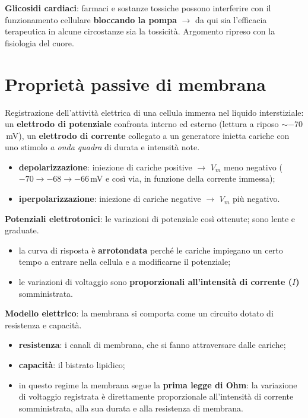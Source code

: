 \textbf{Glicosidi cardiaci}: farmaci e sostanze tossiche possono interferire con il funzionamento
cellulare \textbf{bloccando la pompa} $\rightarrow$ da qui sia l'efficacia terapeutica in alcune
circostanze sia la tossicità. Argomento ripreso con la fisiologia del cuore.

\section{Proprietà passive di membrana}

Registrazione dell'attività elettrica di una cellula immersa nel liquido interstiziale: un
\textbf{elettrodo di potenziale} confronta interno ed esterno (lettura a riposo $\sim-70$\,mV),
un \textbf{elettrodo di corrente} collegato a un generatore inietta cariche con uno stimolo
\textit{a onda quadra} di durata e intensità note.

\begin{itemize}
  \item \textbf{depolarizzazione}: iniezione di cariche positive $\rightarrow$ $V_m$ meno negativo
    ($-70 \rightarrow -68 \rightarrow -66$\,mV e così via, in funzione della corrente immessa);
  \item \textbf{iperpolarizzazione}: iniezione di cariche negative $\rightarrow$ $V_m$ più negativo.
\end{itemize}

\textbf{Potenziali elettrotonici}: le variazioni di potenziale così ottenute; sono lente e graduate.
\begin{itemize}
  \item la curva di risposta è \textbf{arrotondata} perché le cariche impiegano un certo tempo a
    entrare nella cellula e a modificarne il potenziale;
  \item le variazioni di voltaggio sono \textbf{proporzionali all'intensità di corrente ($I$)}
    somministrata.
\end{itemize}

\textbf{Modello elettrico}: la membrana si comporta come un circuito dotato di resistenza e
capacità.
\begin{itemize}
  \item \textbf{resistenza}: i canali di membrana, che si fanno attraversare dalle cariche;
  \item \textbf{capacità}: il bistrato lipidico;
  \item in questo regime la membrana segue la \textbf{prima legge di Ohm}: la variazione di
    voltaggio registrata è direttamente proporzionale all'intensità di corrente somministrata, alla
    sua durata e alla resistenza di membrana.
\end{itemize}

